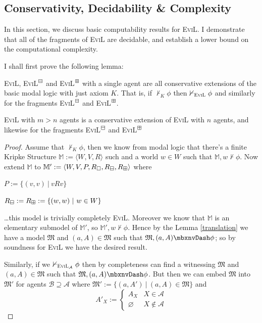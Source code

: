 \subsection{Conservativity, Decidability \& Complexity}

In this section, we discuss basic computability results for \textsc{EviL}. I demonstrate that all of the fragments of \textsc{EviL} are decidable, and establish a lower bound on the computational complexity.

I shall first prove the following lemma:

\begin{lemma}
\textsc{EviL}, \textsc{EviL}$^\boxminus$ and \textsc{EviL}$^\boxplus$ with a single agent are all conservative extensions of the basic modal logic with just axiom $K$.  That is, if $\nvdash_K \phi$ then $\nvdash_{\textup{\textsc{EviL}}} \phi$ and similarly for the fragments \textsc{EviL}$^\boxminus$ and \textsc{EviL}$^\boxplus$.

\textsc{EviL} with $m > n$ agents is a conservative extension of \textsc{EviL} with $n$ agents, and likewise for the fragments \textsc{EviL}$^\boxminus$ and \textsc{EviL}$^\boxplus$ 
\end{lemma}
\begin{proof}
Assume that $\nvdash_K \phi$, then we know from modal logic that there's a finite Kripke Structure $\mathbb{M} := \langle W, V, R\rangle$ such and a world $w \in W$ such that $\mathbb{M},w \nvdash \phi$.  Now extend $\mathbb{M}$ to $\mathbb{M}' := \langle W, V, P, R_\Box, R_\boxminus, R_\boxplus \rangle$ where
\begin{bul}
	\item $P := \{(v,v)\ |\ v R v\}$
	\item $R_\boxminus := R_\boxplus := \{(w,w)\ |\ w \in W\}$
\end{bul}
\ldots this model is trivially completely \textsc{EviL}. Moreover we know that $\mathbb{M}$ is an elementary submodel of $\mathbb{M}'$, so $\mathbb{M}', w\nvdash \phi$.  Hence by the Lemma \ref{translation} we have a model $\mathfrak{M}$ and $(a,A) \in \mathfrak{M}$ such that $\mathfrak{M},(a,A) \nmodels \phi$; so by soundness for \textsc{EviL} we have the desired result.

Similarly, if we $\nvdash_{\textup{\textsc{EviL}}_\mathcal{A}} \phi$ then by completeness can find a witnessing $\mathfrak{M}$ and $(a,A) \in \mathfrak{M}$ such that $\mathfrak{M},(a,A) \nmodels \phi$.  But then we can embed $\mathfrak{M}$ into $\mathfrak{M}'$ for agents $\mathcal{B} \supseteq \mathcal{A}$ where $\mathfrak{M}' := \{(a,A') \ |\ (a,A) \in \mathfrak{M}\}$ and
$$ A'_X := \begin{cases} A_X & X \in\mathcal{A} \\ \varnothing & X \nin \mathcal{A}\end{cases} $$
\end{proof}

